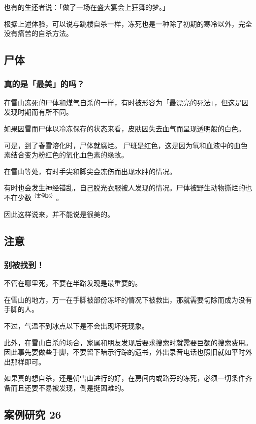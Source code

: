 \documentclass[UTF8]{ctexart}
\begin{document}
也有的生还者说：「做了一场在盛大宴会上狂舞的梦。」

根据上述体验，可以说与跳楼自杀一样，冻死也是一种除了初期的寒冷以外，完全没有痛苦的自杀方法。

\subsection{尸体}

\subsubsection*{真的是「最美」的吗？}


在雪山冻死的尸体和煤气自杀的一样，有时被形容为「最漂亮的死法」，但这是因发现时期而有所不同。

如果因雪而尸体以冷冻保存的状态来看，皮肤因失去血气而呈现透明般的白色。

可是，到了春雪溶化时，尸体就腐烂。
尸班是红色，这是因为氧和血液中的血色素结合变为粉红色的氧化血色素的缘故。

在雪山等处，有时手尖和脚尖会冻伤而出现水肿的情况。

有时也会发生神经错乱，自己脱光衣服被人发现的情况。尸体被野生动物撕烂的也不在少数$^{（案例 26）}$。

因此这样说来，并不能说是很美的。

\subsection{注意}

\subsubsection*{别被找到！}

不管在哪里死，不要在半路发现是最重要的。

在雪山的地方，万一在手脚被部份冻坏的情况下被救出，那就需要切除而成为没有手脚的人。

不过，气温不到冰点以下是不会出现坏死现象。

此外，在雪山自杀的场合，家属和朋友发现后要求搜索时就需要巨额的搜索费用。因此事先要做些手脚，不要留下暗示行踪的遗书，外出录音电话也照旧就如平时外出那样即可。

如果真的想自杀，还是朝雪山进行的好，在房间内或路旁的冻死，必须一切条件齐备而且还要不易被发现，倒是挺困难的。

\subsection{案例研究 26}
\end{document}
